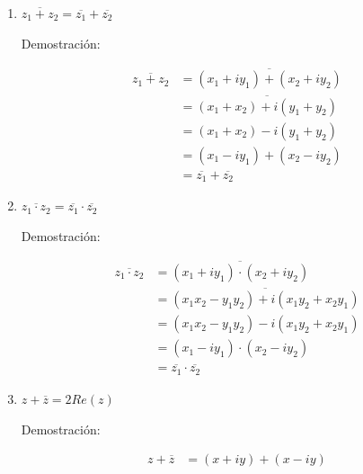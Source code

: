 \documentclass{article}
\theoremstyle{definition}
\begin{document}
    \begin{enumerate}
        \item $\overline{z_{1}+z_{2}} = \overline{z_{1}} + \overline{z_{2}}$
        \begin{center}
            Demostración:
        \end{center}
        \begin{tcolorbox}[colback=white,colframe=black]
            \begin{align*}
                \overline{z_{1}+z_{2}} &= \overline{(x_{1}+iy_{1})+(x_{2}+iy_{2})} \\
                &= \overline{(x_{1}+x_{2})+i(y_{1}+y_{2})} \\
                &= (x_{1}+x_{2})-i(y_{1}+y_{2}) \\
                &= (x_{1}-iy_{1})+(x_{2}-iy_{2}) \\
                &= \overline{z_{1}} + \overline{z_{2}}
            \end{align*}
        \end{tcolorbox}
        \item $\overline{z_{1} \cdotp z_{2}} = \overline{z_{1}} \cdotp \overline{z_{2}}$
        \begin{center}
            Demostración:
        \end{center}
        \begin{tcolorbox}[colback=white,colframe=black]
            \begin{align*}
                \overline{z_{1} \cdotp z_{2}} &= \overline{(x_{1}+iy_{1}) \cdotp (x_{2}+iy_{2})} \\
                &= \overline{(x_{1}x_{2}-y_{1}y_{2})+i(x_{1}y_{2}+x_{2}y_{1})} \\
                &= (x_{1}x_{2}-y_{1}y_{2})-i(x_{1}y_{2}+x_{2}y_{1}) \\
                &= (x_{1}-iy_{1}) \cdotp (x_{2}-iy_{2}) \\
                &= \overline{z_{1}} \cdotp \overline{z_{2}}
            \end{align*}
        \end{tcolorbox}
        \item $z + \overline{z} = 2Re(z)$
        \begin{center}
            Demostración:
        \end{center}
        \begin{tcolorbox}[colback=white,colframe=black]
            \begin{align*}
                z + \overline{z} &= (x+iy) + (x-iy) \\

\end{align*}
\end{tcolorbox}
\end{enumerate}
\end{document}
